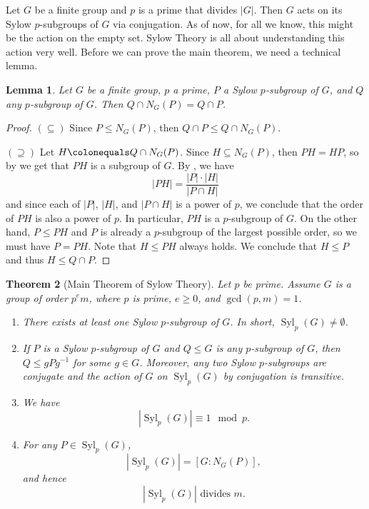 \documentclass[12pt]{report}
\newtheorem{theorem}{Theorem}[chapter]
\newtheorem{lemma}[theorem]{Lemma}
\numberwithin{equation}{section}
\numberwithin{theorem}{chapter}
\theoremstyle{definition}
\newtheorem*{basic properties}{Basic Properties}
\newtheorem*{Important Remark}{Important Remark}
\DeclareMathOperator{\Syl}{Syl}
\begin{document}
Let $G$ be a finite group and $p$ is a prime that divides $|G|$. Then $G$ acts on its Sylow $p$-subgroups of $G$ via conjugation. As of now, for all we know, this might be the action on the empty set. Sylow Theory is all about understanding this action very well. Before we can prove the main theorem, we need a technical lemma.



\begin{lemma}\label{lemma Sylow normalizer}
Let $G$ be a finite group, $p$ a prime, $P$ a Sylow $p$-subgroup of $G$, and $Q$ any $p$-subgroup of $G$. Then $Q \cap N_G(P) = Q \cap P$.	
\end{lemma}


\begin{proof}
$(\subseteq)$ Since $P \leq N_G(P)$, then $Q \cap P \leq Q \cap N_G(P)$. 

$(\supseteq)$ Let $H \colonequals  Q \cap N_G(P)$. Since $H \subseteq N_G(P)$, then $PH=HP$, so by  we get that $PH$ is a subgroup of $G$. 
By , we have
$$|PH| = \frac{|P| \cdot |H|}{|P \cap H|}$$
and since each of $|P|$, $|H|$, and $|P \cap H|$ is a power of $p$, we conclude that the order of $PH$ is also a power of $p$. In particular, $PH$ is a $p$-subgroup of $G$. On the other hand, $P \leq PH$ and $P$ is already a $p$-subgroup of the largest possible order, so we must have $P = PH$. Note that $H \leq PH$ always holds. We conclude that $H \leq P$ and thus $H \leq Q \cap P$.
\end{proof}






\begin{theorem}[Main Theorem of Sylow Theory]\label{Sylow}
Let $p$ be prime.
Assume $G$ is a group of order $p^e m$, where $p$ is prime, $e \geqslant 0$, and $\gcd(p,m) = 1$. 

\begin{enumerate}[itemsep=-0.1em,leftmargin=21pt]
\item There exists at least one Sylow $p$-subgroup of $G$. In short, $\Syl_p(G) \neq \emptyset$.

\item If $P$ is a Sylow $p$-subgroup of $G$ and $Q \leq G$ is any $p$-subgroup of $G$, then $Q \leq gPg^{-1}$ for some $g \in G$. Moreover, any two Sylow $p$-subgroups are conjugate and the action of $G$ on $\Syl_p(G)$ by conjugation is transitive.

\item We have
$$| \Syl_p(G)| \equiv 1 \mod{p}.$$
\item For any $P \in \Syl_p(G)$, 
$$|\Syl_p(G)| = [G: N_G(P)],$$
and hence
$$| \Syl_p(G)| \text{ divides } m.$$
\end{enumerate}
\end{theorem}
\end{document}
